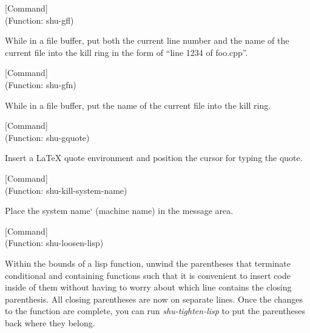\vspace{1em}
\noindent
{}
\usebox{\funcname}
 \hfill [Command]\\%
 (Function: shu-gfl)

\begin{doc-string}
While in a file buffer, put both the current line number and the name of the current
file into the kill ring in the form of ``line 1234 of foo.cpp''.
\end{doc-string}

\vspace{1em}
\noindent
{}
\usebox{\funcname}
 \hfill [Command]\\%
 (Function: shu-gfn)

\begin{doc-string}
While in a file buffer, put the name of the current file into the kill ring.
\end{doc-string}

\vspace{1em}
\noindent
{}
\usebox{\funcname}
 \hfill [Command]\\%
 (Function: shu-gquote)

\begin{doc-string}
Insert a LaTeX quote environment and position the cursor for typing the quote.
\end{doc-string}

\vspace{1em}
\noindent
{}
\usebox{\funcname}
 \hfill [Command]\\%
 (Function: shu-kill-system-name)

\begin{doc-string}
Place the system name` (machine name) in the message area.
\end{doc-string}

\vspace{1em}
\noindent
{}
\usebox{\funcname}
 \hfill [Command]\\%
 (Function: shu-loosen-lisp)

\begin{doc-string}
Within the bounds of a lisp function, unwind the parentheses that terminate
conditional and containing functions such that it is convenient to insert code
inside of them without having to worry about which line contains the closing
parenthesis.  All closing parentheses are now on separate lines.  Once the
changes to the function are complete, you can run \emph{shu-tighten-lisp} to put the
parentheses back where they belong.
\end{doc-string}


